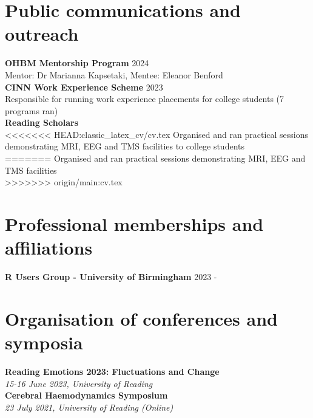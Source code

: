 \documentclass[a4paper,10pt]{article}
\begin{document}
\section{Public communications and outreach}
\vspace{2pt}
\textbf{OHBM Mentorship Program}  \hfill 2024 \\
Mentor: Dr Marianna Kapsetaki, Mentee: Eleanor Benford \\
\vspace{8pt}
\textbf{CINN Work Experience Scheme}  \hfill 2023 \\
Responsible for running work experience placements for college students (7 programs ran) \\
\vspace{8pt}
\textbf{Reading Scholars} \\
<<<<<<< HEAD:classic_latex_cv/cv.tex
Organised and ran practical sessions demonstrating MRI, EEG and TMS facilities to college students\\
=======
Organised and ran practical sessions demonstrating MRI, EEG and TMS facilities \\
>>>>>>> origin/main:cv.tex
\vspace{4pt} 

\section{Professional memberships and affiliations}
\vspace{2pt}
\textbf{R Users Group - University of Birmingham}  \hfill 2023 -  \\
\vspace{8pt}

\section{Organisation of conferences and symposia}
\vspace{2pt}
\textbf{Reading Emotions 2023: Fluctuations and Change}  \\
\textit{15-16 June 2023, University of Reading} \\
\vspace{8pt} 
\textbf{Cerebral Haemodynamics Symposium}  \\
\textit{23 July 2021, University of Reading (Online)} \\
\vspace{4pt}
\end{document}
